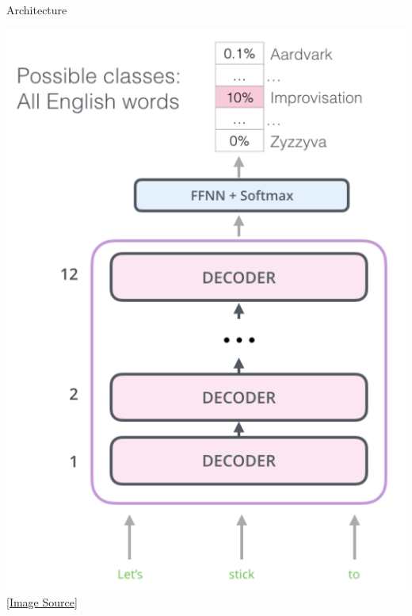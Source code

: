 \begin{frame}[fragile]{Architecture}

    \begin{center}
        \includegraphics[scale=0.25]{../images/img_10.png} \\
        \href{http://jalammar.github.io/illustrated-bert/}{[Image Source]}
    \end{center}

\end{frame}